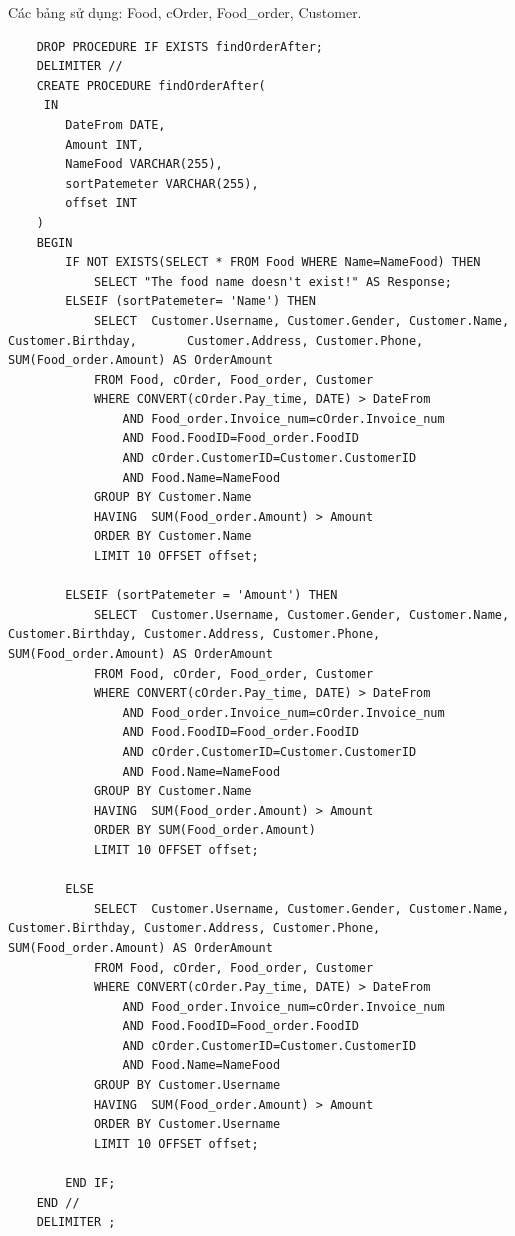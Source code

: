Các bảng sử dụng: Food, cOrder, Food\_order, Customer.
\begin{verbatim}
    DROP PROCEDURE IF EXISTS findOrderAfter;
    DELIMITER //
    CREATE PROCEDURE findOrderAfter(
     IN
        DateFrom DATE,
        Amount INT, 
        NameFood VARCHAR(255),
        sortPatemeter VARCHAR(255),
        offset INT
    )
    BEGIN
        IF NOT EXISTS(SELECT * FROM Food WHERE Name=NameFood) THEN
            SELECT "The food name doesn't exist!" AS Response;
        ELSEIF (sortPatemeter= 'Name') THEN
            SELECT  Customer.Username, Customer.Gender, Customer.Name, Customer.Birthday,       Customer.Address, Customer.Phone, SUM(Food_order.Amount) AS OrderAmount
            FROM Food, cOrder, Food_order, Customer
            WHERE CONVERT(cOrder.Pay_time, DATE) > DateFrom
                AND Food_order.Invoice_num=cOrder.Invoice_num
                AND Food.FoodID=Food_order.FoodID
                AND cOrder.CustomerID=Customer.CustomerID
                AND Food.Name=NameFood
            GROUP BY Customer.Name
            HAVING  SUM(Food_order.Amount) > Amount
            ORDER BY Customer.Name
            LIMIT 10 OFFSET offset;

        ELSEIF (sortPatemeter = 'Amount') THEN
            SELECT  Customer.Username, Customer.Gender, Customer.Name, Customer.Birthday, Customer.Address, Customer.Phone, SUM(Food_order.Amount) AS OrderAmount
            FROM Food, cOrder, Food_order, Customer
            WHERE CONVERT(cOrder.Pay_time, DATE) > DateFrom
                AND Food_order.Invoice_num=cOrder.Invoice_num
                AND Food.FoodID=Food_order.FoodID
                AND cOrder.CustomerID=Customer.CustomerID
                AND Food.Name=NameFood
            GROUP BY Customer.Name
            HAVING  SUM(Food_order.Amount) > Amount
            ORDER BY SUM(Food_order.Amount)
            LIMIT 10 OFFSET offset;

        ELSE
            SELECT  Customer.Username, Customer.Gender, Customer.Name, Customer.Birthday, Customer.Address, Customer.Phone, SUM(Food_order.Amount) AS OrderAmount
            FROM Food, cOrder, Food_order, Customer
            WHERE CONVERT(cOrder.Pay_time, DATE) > DateFrom
                AND Food_order.Invoice_num=cOrder.Invoice_num
                AND Food.FoodID=Food_order.FoodID
                AND cOrder.CustomerID=Customer.CustomerID
                AND Food.Name=NameFood
            GROUP BY Customer.Username
            HAVING  SUM(Food_order.Amount) > Amount
            ORDER BY Customer.Username
            LIMIT 10 OFFSET offset;

        END IF;
    END //
    DELIMITER ;
\end{verbatim}
